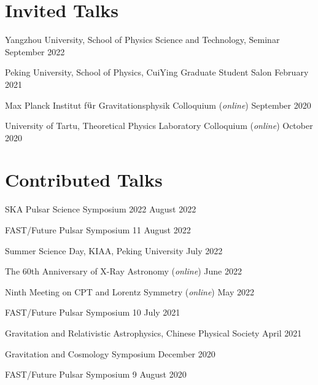 \newcommand{\playsymbol}{$\blacktriangleright$}
\section{\sc Invited Talks}
\begin{etaremune}
  \item 
  Yangzhou University, School of Physics Science and Technology, Seminar
  \hfill{} 
  September 2022
\item 
  Peking University, School of Physics, CuiYing Graduate Student Salon
  \hfill{} 
  February 2021
\item
  Max Planck Institut f$\rm \ddot{u}$r Gravitationsphysik Colloquium ({\it online})
  \hfill{}
  September 2020
\item
  University of Tartu, Theoretical Physics Laboratory Colloquium ({\it online})
  \hfill{}
  October 2020
\end{etaremune}

\section{\sc Contributed Talks}
\begin{etaremune}
\item
  SKA Pulsar Science Symposium 2022
  \hfill{}
  August 2022
\item  
  FAST/Future Pulsar Symposium 11
  \hfill 
  August 2022
\item  
  Summer Science Day, KIAA, Peking University
  \hfill 
  July 2022
\item 
  The 60th Anniversary of X-Ray Astronomy ({\it online})
  \hfill 
  June 2022
\item 
  Ninth Meeting on CPT and Lorentz Symmetry ({\it online})
  \hfill
  May 2022
\item  
  FAST/Future Pulsar Symposium 10
  \hfill 
  July 2021
\item  
  Gravitation and Relativistic Astrophysics, Chinese Physical Society
  \hfill 
  April 2021
\item 
  Gravitation and Cosmology Symposium
  \hfill 
  December 2020
\item 
  FAST/Future Pulsar Symposium 9
  \hfill 
  August 2020
\end{etaremune}


